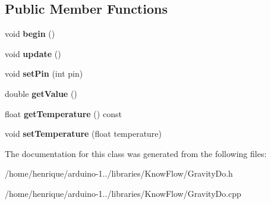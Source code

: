 \subsection*{Public Member Functions}
\begin{DoxyCompactItemize}
\item 
void {\bfseries begin} ()\hypertarget{class_gravity_do_a50230d3b101165f876cd595f5839e40b}{}\label{class_gravity_do_a50230d3b101165f876cd595f5839e40b}

\item 
void {\bfseries update} ()\hypertarget{class_gravity_do_aafb8fcc3cdf0aac907288a0e5eb62b29}{}\label{class_gravity_do_aafb8fcc3cdf0aac907288a0e5eb62b29}

\item 
void {\bfseries set\+Pin} (int pin)\hypertarget{class_gravity_do_a6c4e78fad79943f86f4d5997307bd104}{}\label{class_gravity_do_a6c4e78fad79943f86f4d5997307bd104}

\item 
double {\bfseries get\+Value} ()\hypertarget{class_gravity_do_adaf18c91b1528ffbffceb097df12e54e}{}\label{class_gravity_do_adaf18c91b1528ffbffceb097df12e54e}

\item 
float {\bfseries get\+Temperature} () const \hypertarget{class_gravity_do_a116231bedc63f8ba338f798915b0fb94}{}\label{class_gravity_do_a116231bedc63f8ba338f798915b0fb94}

\item 
void {\bfseries set\+Temperature} (float temperature)\hypertarget{class_gravity_do_aa124f3b58a2315709b783dd64be1c276}{}\label{class_gravity_do_aa124f3b58a2315709b783dd64be1c276}

\end{DoxyCompactItemize}


The documentation for this class was generated from the following files\+:\begin{DoxyCompactItemize}
\item 
/home/henrique/arduino-\/1../libraries/\+Know\+Flow/Gravity\+Do.\+h\item 
/home/henrique/arduino-\/1../libraries/\+Know\+Flow/Gravity\+Do.\+cpp\end{DoxyCompactItemize}
